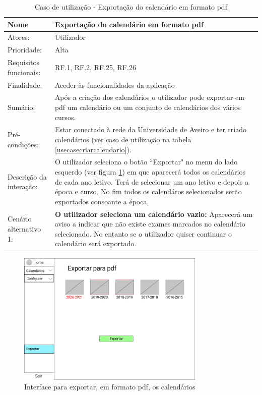 \documentclass[11pt, twoside]{report}
\begin{document}
\def\arraystretch{1.5}
\begin{table}[H]
	\caption{Caso de utilização - Exportação do calendário em formato pdf}
	\begin{center}	
		\begin{tabularx}{\textwidth}{|l|X|}
			\hline
			\textbf{Nome }	& \textbf{Exportação do calendário em formato pdf} \\
			\hline
			Atores: & Utilizador \\
			\hline
			Prioridade: & Alta \\
			\hline
			Requisitos funcionais:& RF.1, RF.2, RF.25, RF.26 \\
			\hline
			Finalidade: & Aceder às funcionalidades da aplicação\\
			\hline
			Sumário: & Após a criação dos calendários o utilizador pode exportar em pdf um calendário ou um conjunto de calendários dos vários cursos. \\
			\hline
			Pré-condições: & Estar conectado à rede da Universidade de Aveiro e ter criado calendários (ver caso de utilização na tabela \ref{usecasecriarcalendario}).\\
			\hline
			Descrição da interação: &  O utilizador seleciona o botão ``Exportar" no menu do lado esquerdo (ver figura \ref{interfaceexportarpdf}) em que aparecerá todos os calendários de cada ano letivo. Terá de selecionar um ano letivo e depois a época e curso. No fim todos os calendáros selecionados serão exportados consoante a época. \\
			\hline
			Cenário alternativo 1:&\textbf{O utilizador seleciona um calendário vazio:} Aparecerá um aviso a indicar que não existe exames marcados no calendário selecionado. No entanto se o utilizador quiser continuar o calendário será exportado.\\
			\hline
			
		\end{tabularx}
	\end{center}
\end{table}

	\begin{figure}[H] 
	\centering 
	\includegraphics[width=0.8\textwidth,height=0.8\textheight,keepaspectratio]{image/prototipowireframes/exportarpdf}
	\caption{Interface para exportar, em formato pdf, os calendários}
	\label{interfaceexportarpdf}
\end{figure}
\end{document}
